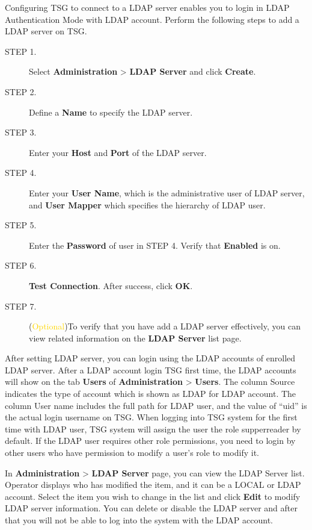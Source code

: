 Configuring TSG to connect to a LDAP server enables you to login in LDAP Authentication Mode with LDAP account. Perform the following steps to add a LDAP server on TSG.


\begin{description}
    \item[STEP 1.]	Select \textbf{Administration} > \textbf{LDAP Server} and click \textbf{Create}.
    \item[STEP 2.]	Define a \textbf{Name} to specify the LDAP server.
    \item[STEP 3.]	Enter your \textbf{Host} and \textbf{Port} of the LDAP server.
    \item[STEP 4.]	Enter your \textbf{User Name}, which is the administrative user of LDAP server, and \textbf{User Mapper} which specifies the hierarchy of LDAP user. 
    \item[STEP 5.]	Enter the \textbf{Password} of user in STEP 4. Verify that \textbf{Enabled} is on.
    \item[STEP 6.]	\textbf{Test Connection}. After success, click \textbf{OK}.
    \item[STEP 7.]	(\textcolor{gold}{Optional})To verify that you have add a LDAP server effectively, you can view related information on the \textbf{LDAP Server} list page. 
\end{description}


After setting LDAP server, you can login using the LDAP accounts of enrolled LDAP server. 
After a LDAP account login TSG first time, the LDAP accounts will show on the tab \textbf{Users} of \textbf{Administration} > \textbf{Users}. 
The column Source indicates the type of account which is shown as LDAP for LDAP account. 
The column User name includes the full path for LDAP user, and the value of “uid” is the actual login username on TSG. 
When logging into TSG system for the first time with LDAP user, TSG system will assign the user the role supperreader by default. 
If the LDAP user requires other role permissions, you need to login by other users who have permission to modify a user’s role to modify it.


In \textbf{Administration} > \textbf{LDAP Server} page, you can view the LDAP Server list. Operator displays who has modified the item, and it can be a LOCAL or LDAP account. 
Select the item you wish to change in the list and click \textbf{Edit} to modify LDAP server information. 
You can delete or disable the LDAP server and after that you will not be able to log into the system with the LDAP account.

